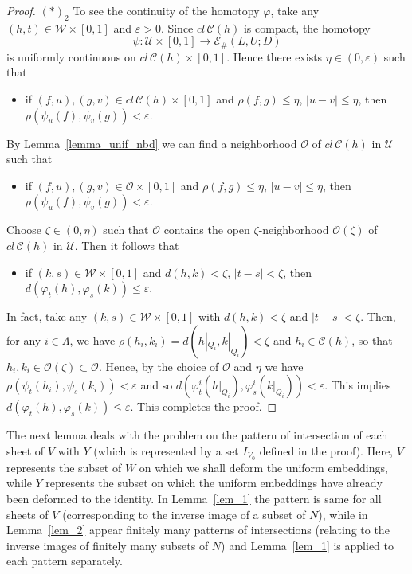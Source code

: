 \documentclass[11pt, fleqn]{amsart}
\theoremstyle{definition}
\newcommand{\cal}{\mathcal}
\renewcommand{\phi}{\varphi}
\newcommand{\lra}{\longrightarrow}
\newcommand{\e}{\varepsilon}
\newcommand{\E}{\mathcal E}
\begin{document}
\begin{proof}
$(\ast)_2$ To see the continuity of the homotopy $\phi$, 
take any $(h,t) \in {\cal W} \times [0,1]$ and $\e > 0$. 
Since $cl\,{\cal C}(h)$ is compact, 
the homotopy 
$$\psi : {\cal U} \times [0,1] \lra 
\E_\#(L, U; D)$$
is uniformly continuous on $cl\,{\cal C}(h) \times [0,1]$. 
Hence there exists $\eta \in (0, \e)$ such that 
\begin{itemize}
\item[] 
if $(f, u), (g, v) \in cl\,{\cal C}(h) \times [0,1]$ and $\rho(f,g) \leq \eta$, $|u-v| \leq \eta$, then $\rho(\psi_u(f),\psi_v(g)) < \e$.  
\end{itemize}
By Lemma~\ref{lemma_unif_nbd} we can find a neighborhood ${\cal O}$ of $cl\,{\cal C}(h)$ in 
${\cal U}$ such that 
\begin{itemize}
\item[] if $(f, u), (g, v) \in {\cal O} \times [0,1]$ and $\rho(f,g) \leq \eta$, $|u-v| \leq \eta$, then $\rho(\psi_u(f),\psi_v(g)) < \e$. 
\end{itemize} 
Choose $\zeta \in (0, \eta)$ such that 
${\cal O}$ contains the open $\zeta$-neighborhood ${\cal O}(\zeta)$ of $cl\,{\cal C}(h)$ in ${\cal U}$. 
Then it follows that  
\begin{itemize}
\item[] if $(k,s) \in {\cal W} \times [0,1]$ and $d(h,k) < \zeta$, $|t-s| < \zeta$, then 
$d(\phi_t(h),\phi_s(k)) \leq \e$. 
\end{itemize} 
In fact, take any $(k,s) \in {\cal W} \times [0,1]$ with $d(h,k) < \zeta$ and $|t-s| < \zeta$. 
Then, for any $i \in \Lambda$, 
we have $\rho(h_i, k_i) = d(h|_{Q_i}, k|_{Q_i}) < \zeta$ and $h_i \in {\cal C}(h)$,  
so that $h_i, k_i \in {\cal O}(\zeta) \subset {\cal O}$. 
Hence, by the choice of ${\cal O}$ and $\eta$ 
we have $\rho(\psi_t(h_i), \psi_s(k_i)) < \e$ and so 
$d(\phi^i_t(h|_{Q_i}), \phi^i_s(k|_{Q_i})) < \e$. 
This implies $d(\phi_t(h),\phi_s(k)) \leq \e$. 
This completes the proof. 
\end{proof}

The next lemma deals with the problem on the pattern of intersection of each sheet of $V$ with $Y$ 
(which is represented by a set $I_{V_0}$ defined in the proof). 
Here, $V$ represents the subset of $W$ on which we shall deform the uniform embeddings, 
while $Y$ represents the subset on which the uniform embeddings have already been deformed to the identity. 
In Lemma~\ref{lem_1} the pattern is same for all sheets of $V$ (corresponding to the inverse image of a subset of $N$), 
while in Lemma~\ref{lem_2} appear finitely many patterns of intersections 
(relating to the inverse images of finitely many subsets of $N$) and   
Lemma~\ref{lem_1} is applied to each pattern separately. 
\end{document}
